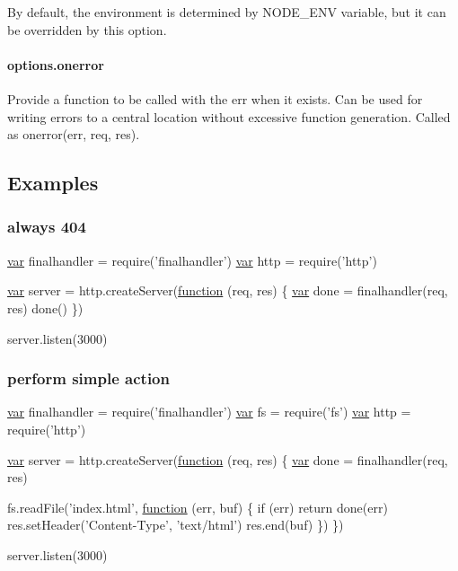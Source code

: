 By default, the environment is determined by {\ttfamily N\+O\+D\+E\+\_\+\+E\+N\+V} variable, but it can be overridden by this option.

\paragraph*{options.\+onerror}

Provide a function to be called with the {\ttfamily err} when it exists. Can be used for writing errors to a central location without excessive function generation. Called as {\ttfamily onerror(err, req, res)}.

\subsection*{Examples}

\subsubsection*{always 404}


\begin{DoxyCode}
\hyperlink{018__def_8c_a335628f2e9085305224b4f9cc6e95ed5}{var} finalhandler = require(\textcolor{stringliteral}{'finalhandler'})
\hyperlink{018__def_8c_a335628f2e9085305224b4f9cc6e95ed5}{var} http = require('http')

\hyperlink{018__def_8c_a335628f2e9085305224b4f9cc6e95ed5}{var} server = http.createServer(\hyperlink{class_test_a51a683fa4fcec142ab1574e00a7b6860}{function} (req, res) \{
  \hyperlink{018__def_8c_a335628f2e9085305224b4f9cc6e95ed5}{var} done = finalhandler(req, res)
  done()
\})

server.listen(3000)
\end{DoxyCode}


\subsubsection*{perform simple action}


\begin{DoxyCode}
\hyperlink{018__def_8c_a335628f2e9085305224b4f9cc6e95ed5}{var} finalhandler = require(\textcolor{stringliteral}{'finalhandler'})
\hyperlink{018__def_8c_a335628f2e9085305224b4f9cc6e95ed5}{var} fs = require('fs')
\hyperlink{018__def_8c_a335628f2e9085305224b4f9cc6e95ed5}{var} http = require('http')

\hyperlink{018__def_8c_a335628f2e9085305224b4f9cc6e95ed5}{var} server = http.createServer(\hyperlink{class_test_a51a683fa4fcec142ab1574e00a7b6860}{function} (req, res) \{
  \hyperlink{018__def_8c_a335628f2e9085305224b4f9cc6e95ed5}{var} done = finalhandler(req, res)

  fs.readFile('index.html', \hyperlink{class_test_a51a683fa4fcec142ab1574e00a7b6860}{function} (err, buf) \{
    \textcolor{keywordflow}{if} (err) \textcolor{keywordflow}{return} done(err)
    res.setHeader('Content-Type', 'text/html')
    res.end(buf)
  \})
\})

server.listen(3000)
\end{DoxyCode}


